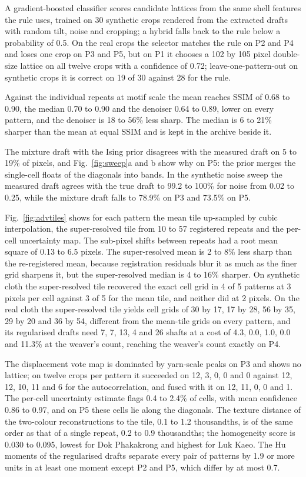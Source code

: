 \documentclass[12pt]{article}
\begin{document}
A gradient-boosted classifier scores candidate lattices from the same shell features the rule uses, trained on 30 synthetic crops rendered from the extracted drafts with random tilt, noise and cropping; a hybrid falls back to the rule below a probability of 0.5. On the real crops the selector matches the rule on P2 and P4 and loses one crop on P3 and P5, but on P1 it chooses a 102 by 105 pixel double-size lattice on all twelve crops with a confidence of 0.72; leave-one-pattern-out on synthetic crops it is correct on 19 of 30 against 28 for the rule.


Against the individual repeats at motif scale the mean reaches SSIM of 0.68 to 0.90, the median 0.70 to 0.90 and the denoiser 0.64 to 0.89, lower on every pattern, and the denoiser is 18 to 56\% less sharp. The median is 6 to 21\% sharper than the mean at equal SSIM and is kept in the archive beside it.


The mixture draft with the Ising prior disagrees with the measured draft on 5 to 19\% of pixels, and Fig.~\ref{fig:sweep}a and b show why on P5: the prior merges the single-cell floats of the diagonals into bands. In the synthetic noise sweep the measured draft agrees with the true draft to 99.2 to 100\% for noise from 0.02 to 0.25, while the mixture draft falls to 78.9\% on P3 and 73.5\% on P5.

Fig.~\ref{fig:advtiles} shows for each pattern the mean tile up-sampled by cubic interpolation, the super-resolved tile from 10 to 57 registered repeats and the per-cell uncertainty map. The sub-pixel shifts between repeats had a root mean square of 0.13 to 6.5 pixels. The super-resolved mean is 2 to 8\% less sharp than the re-registered mean, because registration residuals blur it as much as the finer grid sharpens it, but the super-resolved median is 4 to 16\% sharper. On synthetic cloth the super-resolved tile recovered the exact cell grid in 4 of 5 patterns at 3 pixels per cell against 3 of 5 for the mean tile, and neither did at 2 pixels. On the real cloth the super-resolved tile yields cell grids of 30 by 17, 17 by 28, 56 by 35, 29 by 20 and 36 by 54, different from the mean-tile grids on every pattern, and its regularised drafts need 7, 7, 13, 4 and 26 shafts at a cost of 4.3, 0.0, 1.0, 0.0 and 11.3\% at the weaver's count, reaching the weaver's count exactly on P4.

The displacement vote map is dominated by yarn-scale peaks on P3 and shows no lattice; on twelve crops per pattern it succeeded on 12, 3, 0, 0 and 0 against 12, 12, 10, 11 and 6 for the autocorrelation, and fused with it on 12, 11, 0, 0 and 1. The per-cell uncertainty estimate flags 0.4 to 2.4\% of cells, with mean confidence 0.86 to 0.97, and on P5 these cells lie along the diagonals. The texture distance of the two-colour reconstructions to the tile, 0.1 to 1.2 thousandths, is of the same order as that of a single repeat, 0.2 to 0.9 thousandths; the homogeneity score is 0.030 to 0.095, lowest for Dok Phakakrong and highest for Luk Kaeo. The Hu moments of the regularised drafts separate every pair of patterns by 1.9 or more units in at least one moment except P2 and P5, which differ by at most 0.7.
\end{document}
